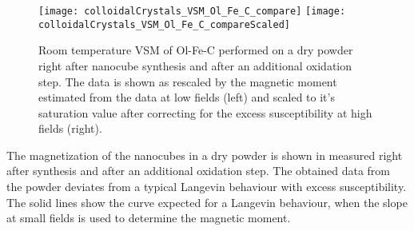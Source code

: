 \documentclass[\main/dresen_thesis.tex]{subfiles}
\begin{document}
  \label{sec:colloidalCrystals:nanoparticle:vsm}
  \begin{figure}[tb]
    \centering
    \texttt{[image: colloidalCrystals\_VSM\_Ol\_Fe\_C\_compare]}
    \texttt{[image: colloidalCrystals\_VSM\_Ol\_Fe\_C\_compareScaled]}
    \caption{\label{fig:colloidalCrystals:nanoparticle:vsm}Room temperature VSM of Ol-Fe-C performed on a dry powder right after nanocube synthesis and after an additional oxidation step. The data is shown as rescaled by the magnetic moment estimated from the data at low fields (left) and scaled to it's saturation value after correcting for the excess susceptibility at high fields (right).}
  \end{figure}
  The magnetization of the nanocubes in a dry powder is shown in  measured right after synthesis and after an additional oxidation step.
  The obtained data from the powder deviates from a typical Langevin behaviour with excess susceptibility.
  The solid lines show the curve expected for a Langevin behaviour, when the slope at small fields is used to determine the magnetic moment.
\end{document}
